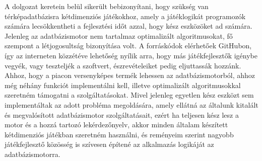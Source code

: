 
A dolgozat keretein belül sikerült bebizonyítani, hogy szükség van térképadatbázisra kétdimenziós játékokhoz, amely a játéklogikát programozók számára lecsökkentheti a fejlesztési időt azzal, hogy kész eszközöket ad számára. Jelenleg az adatbázismotor nem tartalmaz optimalizált algoritmusokat, fő szempont a létjogosultság bizonyítása volt. A forráskódok elérhetőek GitHubon, így az interneten közzétéve lehetőség nyílik arra, hogy más játékfejlesztők igénybe vegyék, vagy teszteljék a szoftvert, észrevételeiket pedig eljuttassák hozzánk. Ahhoz, hogy a piacon versenyképes termék lehessen az adatbázismotorból, ahhoz még néhány funkciót implementálni kell, illetve optimalizált algoritmusokkal szeretném támogatni a szolgáltatásokat. Mivel jelenleg egyetlen kész eszközt sem implementáltak az adott probléma megoldására, amely ellátná az általunk kitalált és megvalósított adatbázismotor szolgáltatásait, ezért ha teljesen kész lesz a motor és a hozzá tartozó lekérdezőnyelv, akkor minden általam készített kétdimenziós játékban szeretném használni, és reményeim szerint nagyobb játékfejlesztő közösség is szívesen építené az alkalmazás logikáját az adatbázismotorra.

